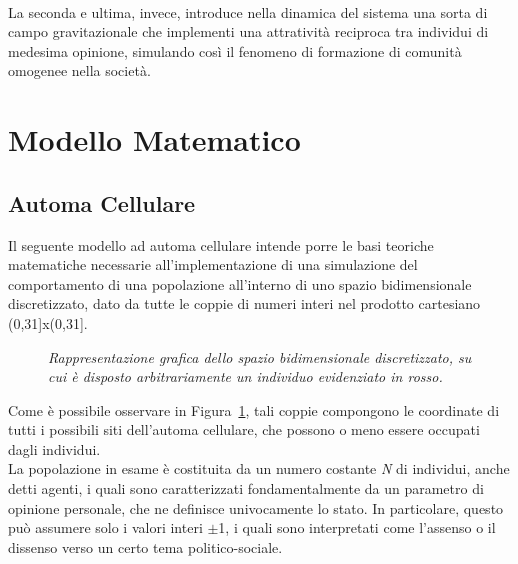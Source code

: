 \documentclass{article}
\begin{document}
\\ La seconda e ultima, invece, introduce nella dinamica del sistema una sorta di campo gravitazionale che implementi una attratività reciproca tra individui di medesima opinione, simulando così il fenomeno di formazione di comunità omogenee nella società.


\section{Modello Matematico}
\label{Sec:2}
\subsection{Automa Cellulare}
\label{Sec:2.1}
Il seguente modello ad automa cellulare intende porre le basi teoriche matematiche necessarie all'implementazione di una simulazione del comportamento di una popolazione all’interno di uno spazio bidimensionale discretizzato, dato da tutte le coppie di numeri interi nel prodotto cartesiano (0,31]x(0,31].

\begin{figure}[h]
\centering
{}
\caption{\textit{Rappresentazione grafica dello spazio bidimensionale discretizzato, su cui è disposto arbitrariamente un individuo evidenziato in rosso.}}
\label{fig:1}
\end{figure}

Come è possibile osservare in Figura~\ref{fig:1}, tali coppie compongono le coordinate di tutti i possibili siti dell'automa cellulare, che possono o meno essere occupati dagli individui.
\\ La popolazione in esame è costituita da un numero costante \textit{N} di individui, anche detti agenti, i quali sono caratterizzati fondamentalmente da un parametro di opinione personale, che ne definisce univocamente lo stato.
In particolare, questo può assumere solo i valori interi $\pm$1, i quali sono interpretati come l'assenso o il dissenso verso un certo tema politico-sociale.
\end{document}

